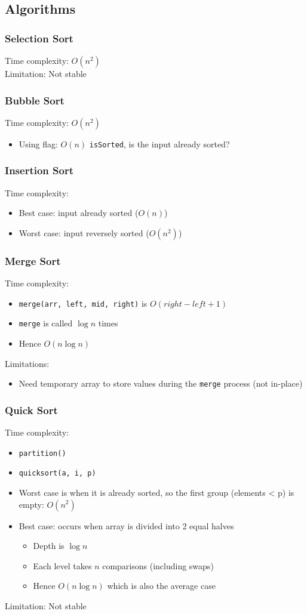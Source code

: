 \documentclass{article}
\begin{document}
\begin{multicols}{2}
\subsection{Algorithms}
\subsubsection{Selection Sort}
Time complexity: $O(n^2)$\\
Limitation: Not stable
\subsubsection{Bubble Sort}
Time complexity: $O(n^2)$
\begin{itemize}
	\item Using flag: $O(n)$ \texttt{isSorted}, is the input already sorted?
\end{itemize}
\subsubsection{Insertion Sort}
Time complexity:
\begin{itemize}
	\item Best case: input already sorted ($O(n)$)
	\item Worst case: input reversely sorted ($O(n^2)$)
\end{itemize}
\subsubsection{Merge Sort}
Time complexity:
\begin{itemize}
	\item \texttt{merge(arr, left, mid, right)} is $O(right-left+1)$
	\item \texttt{merge} is called $\log{n}$ times
	\item Hence $O(n\log{n})$
\end{itemize}
Limitations:
\begin{itemize}
	\item Need temporary array to store values during the \texttt{merge} process (not in-place)
\end{itemize}
\subsubsection{Quick Sort}
Time complexity:
\begin{itemize}
	\item \texttt{partition()}
	\item \texttt{quicksort(a, i, p)}
	\item Worst case is when it is already sorted, so the first group (elements < p) is empty: $O(n^2)$
	\item Best case: occurs when array is divided into 2 equal halves
	\begin{itemize}
		\item Depth is $\log{n}$
		\item Each level takes $n$ comparisons (including swaps)
		\item Hence $O(n\log{n})$ which is also the average case
	\end{itemize}
\end{itemize}
Limitation: Not stable

\end{multicols}
\end{document}
